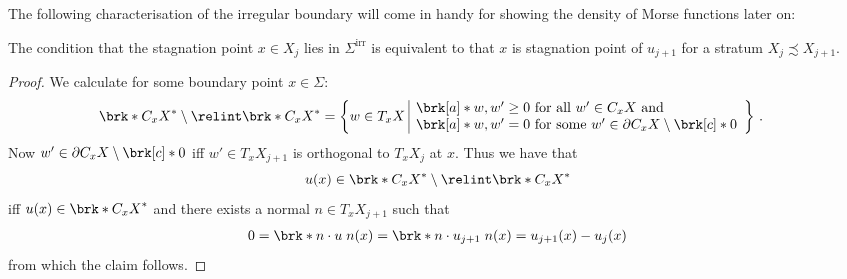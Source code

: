 The following characterisation of the irregular boundary will come in handy for showing the density of Morse functions later on:
\begin{proposition}\label{pr:characterisation_irregular_bd}
  The condition that the stagnation point $x\in X_j$ lies in $\Sigma^\text{irr}$ is equivalent to that
  $x$ is stagnation point of $u_{j+1}$ for a stratum $X_j\precsim X_{j+1}$.
\end{proposition}
\begin{proof}
  We calculate for some boundary point $x\in\Sigma$:
  \begin{align*}
    \brk*{C_xX}^*\setminus\relint\brk*{C_xX}^*
    &=\left\{w\in T_xX\;\begin{array}{|l}
      \brk[a]*{w,w'}\geq0\text{ for all }w'\in C_xX\text{ and }\\
      \brk[a]*{w,w'}=0\text{ for some }w'\in \partial C_xX\setminus\brk[c]*{0}
    \end{array}\right\}\,.
  \end{align*}
  Now $w'\in\partial C_xX\setminus\brk[c]*{0}$ iff $w'\in T_xX_{j+1}$ is orthogonal to $T_xX_j$ at $x$.
  Thus we have that $$u(x)\in \brk*{C_xX}^*\setminus\relint\brk*{C_xX}^*$$ iff $u(x)\in \brk*{C_xX}^*$
  and there exists a normal $n\in T_xX_{j+1}$ such that
  \begin{align*}
    0=\brk*{n\cdot u\;n}(x)=\brk*{n\cdot u_{j+1}\;n}(x)=u_{j+1}(x)-u_j(x)
  \end{align*}
  from which the claim follows.
\end{proof}

